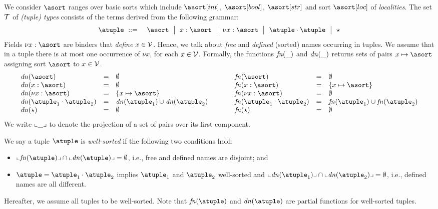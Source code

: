 %
We consider $\asort$ ranges over basic sorts which include
$\asort[int]$, $\asort[bool]$, $\asort[str]$ and sort $\asort[loc]$ of
\emph{localities}.
%
The set $\mathcal{T}$ of \emph{(tuple) types} consists of the terms
derived from the following grammar:
\begin{eqnarray*}
  \atuple & \bnfdef & \asort \bnfmid
                      x : \asort \bnfmid
                      \nu x : \asort  \bnfmid
                      \atuple \cdot \atuple \bnfmid
                      \wildcard
\end{eqnarray*}
Fields $\nu x : \asort$ are binders that \emph{define}
$x \in \mathcal{V}$.
%
Hence, we talk about \emph{free} and \emph{defined} (sorted) names occurring in
tuples.
%
We assume that in a tuple there is at most one occurrence of $\nu x$,
for each $x \in \mathcal{V}$.
%
Formally, the functions ${\it fn}(\_)$ and ${\it dn}(\_)$ returns sets of pairs
$x \mapsto \asort$ assigning sort $\asort$ to $x \in \mathcal{V}$.
\[
\begin{array}{l@{\hspace{1cm}}l}
\begin{array}{lcl}
  \dn\asort & = & \emptyset
  \\
  \dn{x : \asort} & = & \emptyset
  \\
  \dn{\nu x : \asort} & = & \{x \mapsto \asort \}
  \\
  \dn{\atuple_1 \cdot \atuple_2} & = & \dn{\atuple_1} \cup \dn{\atuple_2}
  \\
  \dn{\wildcard} & = & \emptyset
\end{array}
&
\begin{array}{lcl}
  \fn\asort & = & \emptyset
  \\
  \fn{x : \asort} & = &  \{x \mapsto \asort\}
  \\
  \fn{\nu x : \asort} & = & \emptyset
  \\
  \fn{\atuple_1 \cdot \atuple_2} & = & \fn{\atuple_1} \cup \fn{\atuple_2}
  \\
  \fn{\wildcard} & = & \emptyset
\end{array}
\end{array}
\]
We write $\llcorner\_\lrcorner$ to denote the projection of a set of pairs over its first component. 

We say a tuple $\atuple$ is {\em well-sorted} if the following two
conditions hold:
\begin{itemize}
\item
  $\supp{\fn\atuple} \cap \supp{\dn{\atuple}} = \emptyset$, i.e., free and
  defined names are disjoint; and
\item
  $\atuple = \atuple_1 \cdot \atuple_2$ implies $\atuple_1$ and
  $\atuple_2$ well-sorted and $\supp{\dn{\atuple_1}} \cap \supp{\dn{\atuple_2}} =
  \emptyset$, i.e., defined names are all different.	 
\end{itemize}
%
Hereafter, we assume all tuples to be well-sorted.
%
Note that $\fn{\atuple}$ and $\dn{\atuple}$ are partial functions for
well-sorted tuples.

